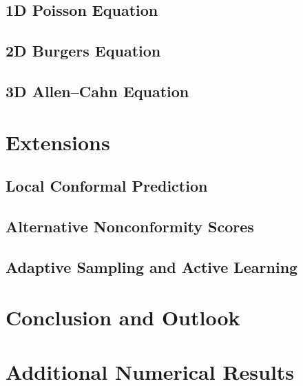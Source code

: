 \documentclass[preprint,12pt]{elsarticle}
\begin{document}
\subsection{1D Poisson Equation}
\label{sec:1d}
\subsection{2D Burgers Equation}
\label{sec:2d}
\subsection{3D Allen–Cahn Equation}
\label{sec:3d}

\section{Extensions}
\label{sec:extension}

\subsection{Local Conformal Prediction}
\label{sec:extension:localcp}

\subsection{Alternative Nonconformity Scores}
\label{sec:extension:nonconf}

\subsection{Adaptive Sampling and Active Learning}
\label{sec:extension:active}

\section{Conclusion and Outlook}
\label{sec:conclusion}

\appendix

\section{Additional Numerical Results}
\label{sec:apd:numerics}

 






\end{document}
